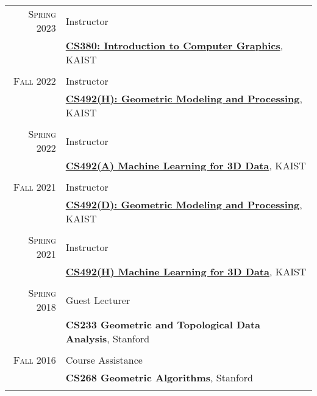 \documentclass[letterpaper,10pt]{article} %
\begin{document}
{\begin{tabular}{r|p{11cm}}

\textsc{Spring 2023} & Instructor\\
& \href{https://mhsung.github.io/kaist-cs380-spring-2023/}{\textbf{CS380: Introduction to Computer Graphics}}, KAIST\\
& \\


\textsc{Fall 2022} & Instructor\\
& \href{https://mhsung.github.io/kaist-cs492h-fall-2022/}{\textbf{CS492(H): Geometric Modeling and Processing}}, KAIST\\
& \\


\textsc{Spring 2022} & Instructor\\
& \href{https://mhsung.github.io/kaist-cs492a-spring-2022/}{\textbf{CS492(A) Machine Learning for 3D Data}}, KAIST\\
& \\


\textsc{Fall 2021} & Instructor\\
& \href{https://mhsung.github.io/kaist-cs492d-fall-2021/}{\textbf{CS492(D): Geometric Modeling and Processing}}, KAIST\\
& \\


\textsc{Spring 2021} & Instructor\\
& \href{https://mhsung.github.io/courses/kaist-cs492h-spring-2021/}{\textbf{CS492(H) Machine Learning for 3D Data}}, KAIST\\
& \\


\textsc{Spring 2018} & Guest Lecturer\\
& \textbf{CS233 Geometric and Topological Data Analysis}, Stanford\\
& \\


\textsc{Fall 2016} & Course Assistance\\
& \textbf{CS268 Geometric Algorithms}, Stanford\\
& \\


\end{tabular}}
\end{document}
